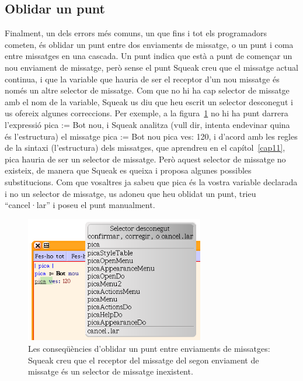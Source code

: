 \subsection{Oblidar un punt}
Finalment, un dels errors més comuns, un que fins i tot els programadors cometen, és oblidar un punt entre dos enviaments de missatge, o un punt i coma entre missatges en una cascada. Un punt indica que està a punt de començar un nou enviament de missatge, però sense el punt Squeak creu que el missatge actual continua, i que la variable que hauria de ser el receptor d'un nou missatge és només un altre selector de missatge. Com que no hi ha cap selector de missatge amb el nom de la variable, Squeak us diu que heu escrit un selector desconegut i us ofereix algunes correccions. Per exemple, a la figura~\ref{fig0209} no hi ha punt darrera l'expressió \textsf{pica := Bot nou}, i Squeak analitza (vull dir, intenta endevinar quina és l'estructura) el missatge  \textsf{pica := Bot nou pica ves: 120}, i d'acord amb les regles de la sintaxi (l'estructura) dels missatges, que aprendreu en el capítol~\ref{cap11}, \textsf{pica} hauria de ser un selector de missatge. Però aquest selector de missatge no existeix, de manera que Squeak es queixa i proposa algunes possibles substitucions. Com que vosaltres ja sabeu que  \textsf{pica} és la vostra variable declarada i no un selector de missatge, us adoneu que heu oblidat un punt, trieu ``cancel·lar'' i poseu el punt manualment.

\begin{figure}[h]
\begin{center}
\includegraphics[height=55mm ,width=78mm ]{Imatges/figura2-9.png}
\end{center}
\caption{Les conseqüències d'oblidar un punt entre enviaments de missatges: Squeak creu que el receptor del missatge del segon enviament de missatge és un selector de missatge inexistent.}
\label{fig0209}
\end{figure}

